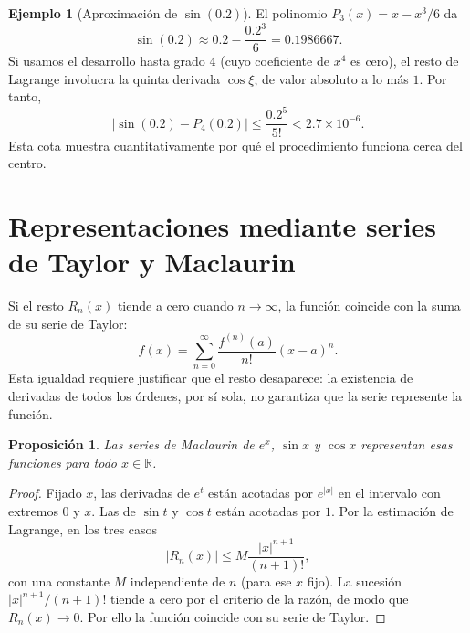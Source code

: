 \documentclass[12pt]{article}
\newtheorem{proposicion}[teorema]{Proposición}
\theoremstyle{definition}
\newtheorem{ejemplo}[teorema]{Ejemplo}
\theoremstyle{remark}
\newcommand{\R}{\mathbb{R}}
\begin{document}
\begin{ejemplo}[Aproximación de $\sin(0.2)$]
El polinomio $P_3(x)=x-x^3/6$ da
\[\sin(0.2)\approx0.2-\frac{0.2^3}{6}=\boxed{0.1986667}.\]
Si usamos el desarrollo hasta grado $4$ (cuyo coeficiente de $x^4$ es cero), el resto de Lagrange involucra la quinta derivada $\cos \xi$, de valor absoluto a lo más $1$. Por tanto,
\[|\sin(0.2)-P_4(0.2)|\le\frac{0.2^5}{5!}<2.7\times10^{-6}.\]
Esta cota muestra cuantitativamente por qué el procedimiento funciona cerca del centro.
\end{ejemplo}

\section{Representaciones mediante series de Taylor y Maclaurin}
Si el resto $R_n(x)$ tiende a cero cuando $n\to\infty$, la función coincide con la suma de su serie de Taylor:
\[f(x)=\sum_{n=0}^\infty\frac{f^{(n)}(a)}{n!}(x-a)^n.\]
Esta igualdad requiere justificar que el resto desaparece: la existencia de derivadas de todos los órdenes, por sí sola, no garantiza que la serie represente la función.
\begin{proposicion}
Las series de Maclaurin de $e^x$, $\sin x$ y $\cos x$ representan esas funciones para todo $x\in\R$.
\end{proposicion}
\begin{proof}
Fijado $x$, las derivadas de $e^t$ están acotadas por $e^{|x|}$ en el intervalo con extremos $0$ y $x$. Las de $\sin t$ y $\cos t$ están acotadas por $1$. Por la estimación de Lagrange, en los tres casos
\[|R_n(x)|\le M\frac{|x|^{n+1}}{(n+1)!},\]
con una constante $M$ independiente de $n$ (para ese $x$ fijo). La sucesión $|x|^{n+1}/(n+1)!$ tiende a cero por el criterio de la razón, de modo que $R_n(x)\to0$. Por ello la función coincide con su serie de Taylor.
\end{proof}
\end{document}
